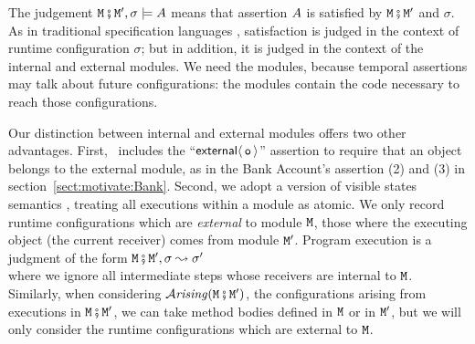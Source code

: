 
The judgement ${\mbox{\tt{\ensuremath{{\mbox{\tt{M}}}}}}} \fatsemi  {{\mbox{\tt{\ensuremath{{\mbox{\tt{M}}}}}}}'},\sigma \models A$ means that  
assertion $A$ is satisfied by  ${\mbox{\tt{\ensuremath{{\mbox{\tt{M}}}}}}} \fatsemi  {{\mbox{\tt{\ensuremath{{\mbox{\tt{M}}}}}}}'}$ and $\sigma$.  
As in traditional specification languages \cite{Leavens-etal07,Meyer92}, satisfaction is judged 
in the context of  runtime configuration $\sigma$; but in addition, it is judged in the context of the internal and external modules.
We need the modules, because temporal assertions may
talk about future configurations: the modules contain the code necessary to reach those configurations.

Our distinction between internal and external modules offers two other advantages.
First, 
\Chainmail\ includes the ``${\mathsf{external}}\langle\, {\mbox{\tt{o}}}\, \rangle$'' assertion to require
that an object belongs to the external module, as in the Bank
Account's assertion (2) and (3) in
section~\ref{sect:motivate:Bank}. Second, we adopt a version of
visible states semantics \cite{MuellerPoetzsch-HeffterLeavens06,larch93,Meyer97}, treating all
executions within a module as atomic.
We only record runtime configurations which are {\em external}
 to module ${\mbox{\tt{\ensuremath{{\mbox{\tt{M}}}}}}}$, \ie those where the
 executing object (\ie the current receiver) comes from module ${\mbox{\tt{\ensuremath{{\mbox{\tt{M}}}}}}}'$.
 Program execution is
 a judgment of the form
${\mbox{\tt{\ensuremath{{\mbox{\tt{M}}}}}}} \fatsemi  {{\mbox{\tt{\ensuremath{{\mbox{\tt{M}}}}}}}'},\sigma \leadsto \sigma'$\\  
where we ignore all intermediate steps
 whose receivers are internal to ${\mbox{\tt{\ensuremath{{\mbox{\tt{M}}}}}}}$. 
Similarly, when considering ${\mathcal{A}}\textrm{\textit{rising}}({\mbox{\tt{\ensuremath{{\mbox{\tt{M}}}}}}} \fatsemi  {{\mbox{\tt{\ensuremath{{\mbox{\tt{M}}}}}}}'})$, \ie the configurations arising from 
executions in ${\mbox{\tt{\ensuremath{{\mbox{\tt{M}}}}}}} \fatsemi  {{\mbox{\tt{\ensuremath{{\mbox{\tt{M}}}}}}}'}$, we can take method bodies defined in ${\mbox{\tt{\ensuremath{{\mbox{\tt{M}}}}}}}$ or in ${\mbox{\tt{\ensuremath{{\mbox{\tt{M}}}}}}}'$, but we will only consider the runtime 
configurations which are external to ${\mbox{\tt{\ensuremath{{\mbox{\tt{M}}}}}}}$.





